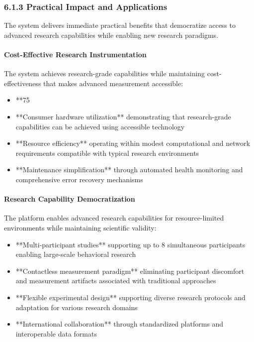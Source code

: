 \documentclass[12pt,a4paper]{article}
\begin{document}
\subsubsection{6.1.3 Practical Impact and Applications}

The system delivers immediate practical benefits that democratize access to advanced research capabilities while
enabling new research paradigms.

\paragraph{Cost-Effective Research Instrumentation}

The system achieves research-grade capabilities while maintaining cost-effectiveness that makes advanced measurement
accessible:

\begin{itemize}
\item **75%
\item **Consumer hardware utilization** demonstrating that research-grade capabilities can be achieved using accessible
  technology
\item **Resource efficiency** operating within modest computational and network requirements compatible with typical
  research environments
\item **Maintenance simplification** through automated health monitoring and comprehensive error recovery mechanisms

\end{itemize}
\paragraph{Research Capability Democratization}

The platform enables advanced research capabilities for resource-limited environments while maintaining scientific
validity:

\begin{itemize}
\item **Multi-participant studies** supporting up to 8 simultaneous participants enabling large-scale behavioral research
\item **Contactless measurement paradigm** eliminating participant discomfort and measurement artifacts associated with
  traditional approaches
\item **Flexible experimental design** supporting diverse research protocols and adaptation for various research domains
\item **International collaboration** through standardized platforms and interoperable data formats

\end{itemize}
\end{document}
